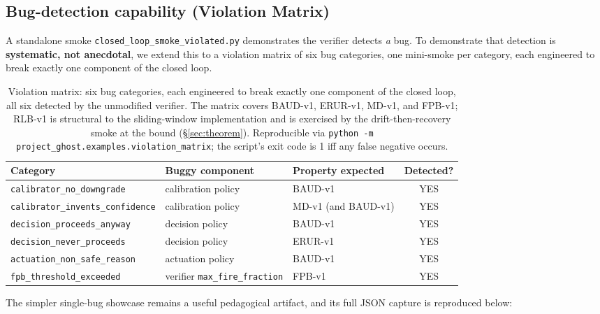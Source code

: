 \documentclass[acmsmall,nonacm=true,review=false]{acmart}
\theoremstyle{plain}
\begin{document}
\subsection{Bug-detection capability (Violation Matrix)}
\label{sec:violation}

A standalone smoke \texttt{closed\_loop\_smoke\_violated.py}
demonstrates the verifier detects \emph{a} bug. To demonstrate that
detection is \textbf{systematic, not anecdotal}, we extend this to
a violation matrix of six bug categories, one mini-smoke per
category, each engineered to break exactly one component of the
closed loop.

\begin{table}[h]
\centering
\small
\begin{tabular}{lll c}
\toprule
\textbf{Category} & \textbf{Buggy component} & \textbf{Property expected} & \textbf{Detected?} \\
\midrule
\texttt{calibrator\_no\_downgrade}        & calibration policy           & BAUD-v1               & YES \\
\texttt{calibrator\_invents\_confidence}  & calibration policy           & MD-v1 (and BAUD-v1)   & YES \\
\texttt{decision\_proceeds\_anyway}       & decision policy              & BAUD-v1               & YES \\
\texttt{decision\_never\_proceeds}        & decision policy              & ERUR-v1               & YES \\
\texttt{actuation\_non\_safe\_reason}     & actuation policy             & BAUD-v1               & YES \\
\texttt{fpb\_threshold\_exceeded}         & verifier \texttt{max\_fire\_fraction} & FPB-v1     & YES \\
\bottomrule
\end{tabular}
\caption{Violation matrix: six bug categories, each engineered to
break exactly one component of the closed loop, all six detected
by the unmodified verifier. The matrix covers BAUD-v1, ERUR-v1,
MD-v1, and FPB-v1; RLB-v1 is structural to the sliding-window
implementation and is exercised by the drift-then-recovery smoke at
the bound (\S\ref{sec:theorem}). Reproducible via
\texttt{python -m project\_ghost.examples.violation\_matrix};
the script's exit code is 1 iff any false negative occurs.}
\label{tab:violation-matrix}
\end{table}

The simpler single-bug showcase remains a useful pedagogical
artifact, and its full JSON capture is reproduced below:
\end{document}
